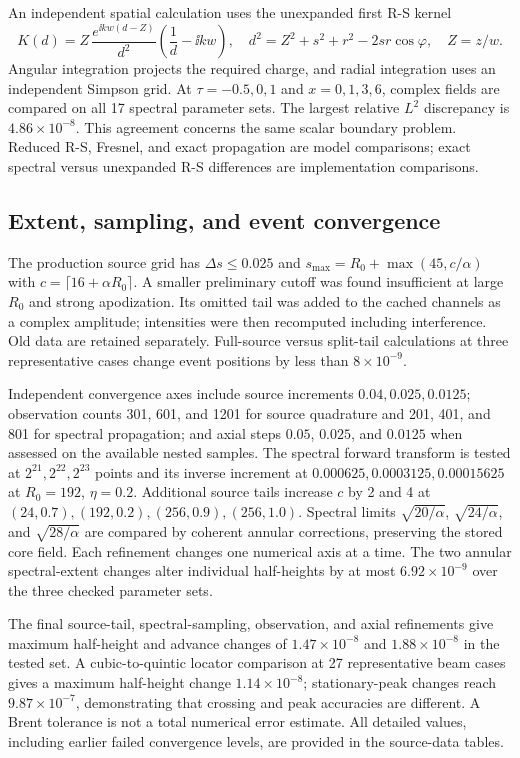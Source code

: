 An independent spatial calculation uses the unexpanded first R-S kernel
\begin{equation}
K(d)=Z\,\frac{e^{\ii kw(d-Z)}}{d^2}
\left(\frac1d-\ii kw\right),\quad
d^2=Z^2+s^2+r^2-2sr\cos\varphi,\quad Z=z/w.
\end{equation}
Angular integration projects the required charge, and radial integration
uses an independent Simpson grid. At $\tau=-0.5,0,1$ and
$x=0,1,3,6$, complex fields are compared on all 17 spectral parameter
sets. The largest relative $L^2$ discrepancy is $4.86\times10^{-8}$.
This agreement concerns the same scalar boundary problem. Reduced R-S,
Fresnel, and exact propagation are model comparisons; exact spectral
versus unexpanded R-S differences are implementation comparisons.

\subsection{Extent, sampling, and event convergence}
The production source grid has $\Delta s\leq0.025$ and
$s_{\max}=R_0+\max(45,c/\alpha)$ with
$c=\lceil16+\alpha R_0\rceil$. A smaller preliminary cutoff was found
insufficient at large $R_0$ and strong apodization. Its omitted tail was
added to the cached channels as a complex amplitude; intensities were
then recomputed including interference. Old data are retained separately.
Full-source versus split-tail calculations at three representative cases
change event positions by less than $8\times10^{-9}$.

Independent convergence axes include source increments $0.04,0.025,0.0125$;
observation counts 301, 601, and 1201 for source quadrature and
201, 401, and 801 for
spectral propagation; and axial steps $0.05$, $0.025$, and $0.0125$ when assessed
on the available nested samples. The spectral forward transform is tested
at $2^{21},2^{22},2^{23}$ points and its inverse increment at
$0.000625,0.0003125,0.00015625$ at $R_0=192$, $\eta=0.2$.
Additional source tails increase $c$ by 2 and 4 at
$(24,0.7),(192,0.2),(256,0.9),(256,1.0)$.
Spectral limits $\sqrt{20/\alpha}$, $\sqrt{24/\alpha}$, and
$\sqrt{28/\alpha}$ are compared by coherent annular corrections,
preserving the stored core field. Each refinement changes one numerical
axis at a time. The two annular spectral-extent changes alter
individual half-heights by at most $6.92\times10^{-9}$ over the
three checked parameter sets.

The final source-tail, spectral-sampling, observation, and axial refinements
give maximum half-height and advance changes of $1.47\times10^{-8}$
and $1.88\times10^{-8}$ in the tested set. A cubic-to-quintic locator
comparison at 27 representative beam cases gives a maximum half-height
change $1.14\times10^{-8}$; stationary-peak changes reach
$9.87\times10^{-7}$, demonstrating that crossing and peak accuracies
are different. A Brent tolerance is not a total numerical error estimate.
All detailed values, including earlier failed convergence levels, are
provided in the source-data tables.


